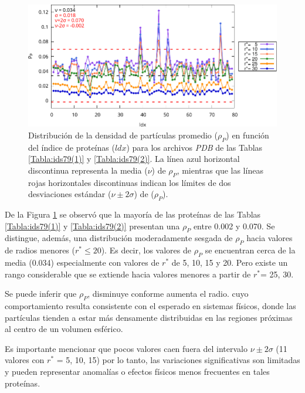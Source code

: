  	\begin{figure}[H]
 		\centering
 		\includegraphics[width=\linewidth]{graphs/ldx-dp.pdf}
 		\caption{Distribuci\'{o}n de la densidad de 
 			part\'{i}culas promedio ($\rho_P$) en funci\'{o}n del 
 			\'{i}ndice de prote\'{i}nas ($ldx$) para los 
 			archivos \emph{PDB} de las Tablas 
 			\ref{Tabla:ids79(1)} y \ref{Tabla:ids79(2)}. La l\'{i}nea azul horizontal 
 			discontinua representa la media ($\nu$) de   
 			$\rho_P$, mientras que las l\'{i}neas rojas horizontales discontinuas indican los l\'{i}mites de dos desviaciones est\'{a}ndar (\(\nu \pm 2\sigma\)) de ($\rho_P$).}
 		\label{index-vs-density}
 	\end{figure}
 	
 	
 	De la Figura \ref{index-vs-density} se observ\'{o} que la mayor\'{i}a de las prote\'{i}nas de las Tablas \ref{Tabla:ids79(1)} y \ref{Tabla:ids79(2)}  presentan una $\rho_P$ entre 0.002 y 0.070. 
 	Se distingue, adem\'{a}s, una distribuci\'{o}n moderadamente sesgada de $\rho_P$ hacia valores de radios menores ($r^* \leq 20$). Es decir, los valores de \(\rho_P\) se encuentran cerca de la media (0.034) especialmente con valores de $r^*$ de 5, 10, 15 y 20. Pero existe un rango considerable que se extiende hacia valores menores a partir de $r^*$= 25, 30.
 	
 	
 	Se puede inferir que $\rho_P$, disminuye conforme aumenta el radio. cuyo comportamiento resulta consistente con el esperado en sistemas f\'{i}sicos, donde las part\'{i}culas tienden a estar m\'{a}s densamente distribuidas en las regiones pr\'{o}ximas al centro de un volumen esf\'{e}rico.
 	
 	Es importante mencionar que pocos valores caen fuera del intervalo $\nu \pm 2\sigma$ (11 valores con $r^*$ = 5, 10, 15) por lo tanto, las variaciones significativas son limitadas y pueden representar anomal\'{i}as o efectos f\'{i}sicos menos frecuentes en tales prote\'{i}nas.
 	
